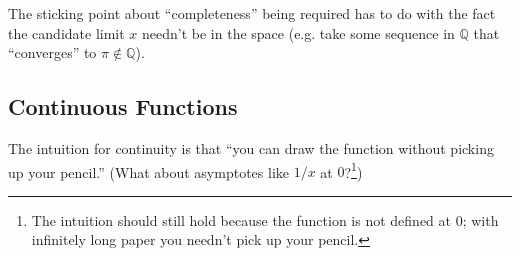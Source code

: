 \documentclass{article}
\begin{document}
\begin{remark}
  The sticking point about ``completeness'' being required has to do with the fact the candidate limit $x$ needn't be in the space (e.g. take some sequence in $\mathbb{Q}$ that ``converges'' to $\pi \notin \mathbb{Q}$).
\end{remark}

\subsection{Continuous Functions}
\label{sub:continuous_functions}

The intuition for continuity is that ``you can draw the function without picking up your pencil.'' (What about asymptotes like $1/x$ at $0$?\footnote{The intuition should still hold because the function is not defined at $0$; with infinitely long paper you needn't pick up your pencil.})
\end{document}
